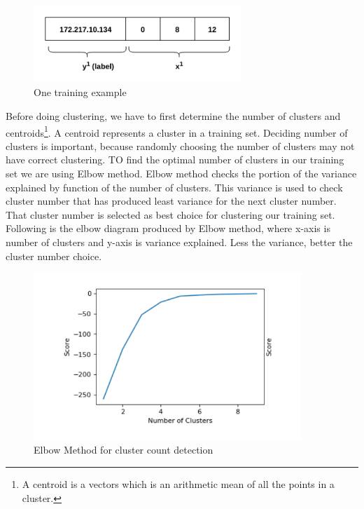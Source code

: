 \documentclass[12pt,oneside,a4paper]{article}
\begin{document}
\begin{figure}[H]
\centering
\includegraphics[width=0.70\textwidth]{training_example.png}
\caption{One training example} \label{fig:training_example}
\end{figure}

Before doing clustering, we have to first determine the number of clusters and centroids\footnote{A centroid is a vectors which is an arithmetic mean of all the points in a cluster.}. A centroid represents a cluster in a training set. Deciding number of clusters is important, because randomly choosing the number of clusters may not have correct clustering. TO find the optimal number of clusters in our training set we are using Elbow method. Elbow method checks the portion of the variance explained by function of the number of clusters. This variance is used to check cluster number that has produced least variance for the next cluster number. That cluster number is selected as best choice for clustering our training set. Following is the elbow diagram produced by Elbow method, where x-axis is number of clusters and y-axis is variance explained. Less the variance, better the cluster number choice.

\begin{figure}[H]
\centering
\includegraphics[width=0.90\textwidth]{elbow-method.png}
\caption{Elbow Method for cluster count detection} \label{fig:elbow-method}
\end{figure}
\end{document}
